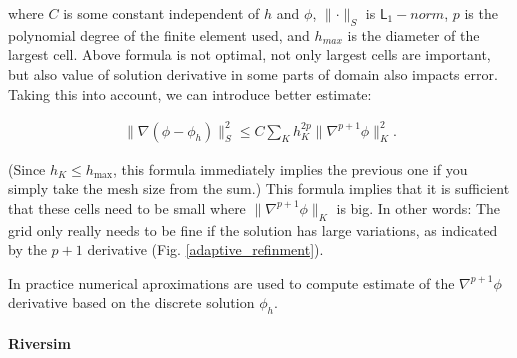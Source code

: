 \documentclass[]{pracamgr}
\begin{document}
        where $C$ is some constant independent of $h$ and $\phi$, $\parallel \cdot \parallel_S $ is $\mathsf{L}_1-norm$, $p$ is the polynomial degree of the finite element used, and $h_{max}$ is the diameter of the largest cell. Above formula is not optimal, not only largest cells are important, but also value of solution derivative in some parts of domain also impacts error. Taking this into account, we can introduce better estimate:
        

        \begin{align*}
          \|\nabla(\phi-\phi_h)\|_{S}^2 \le C \sum_K h_K^{2p} \| \nabla^{p+1} \phi \|^2_K.
        \end{align*}

        (Since $h_K\le h_\text{max}$, this formula immediately implies the previous one if you simply take the mesh size from the sum.) This formula implies that it is sufficient that these cells need to be small where $\| \nabla^{p+1} \phi \|_K$ is big. In other words: The grid only really needs to be fine if the solution has large variations, as indicated by the $p+1$ derivative (Fig. \ref{adaptive_refinment}).
        
        In practice numerical aproximations are used to compute estimate of the $\nabla^{p+1} \phi$ derivative based on the discrete solution $\phi_h$.

      \paragraph{Riversim}
        
\end{document}
